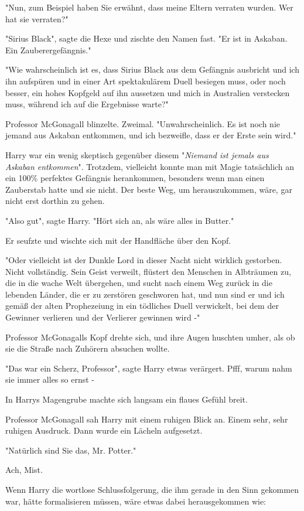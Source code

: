 {"Nun, zum Beispiel haben Sie erwähnt, dass meine Eltern verraten wurden. Wer hat sie verraten?"

"Sirius Black", sagte die Hexe und zischte den Namen fast. "Er ist in Askaban. Ein Zauberergefängnis."

"Wie wahrscheinlich ist es, dass Sirius Black aus dem Gefängnis ausbricht und ich ihn aufspüren und in einer Art spektakulärem Duell besiegen muss, oder noch besser, ein hohes Kopfgeld auf ihn aussetzen und mich in Australien verstecken muss, während ich auf die Ergebnisse warte?"

Professor McGonagall blinzelte. Zweimal. "Unwahrscheinlich. Es ist noch nie jemand aus Askaban entkommen, und ich bezweifle, dass er der Erste sein wird."

Harry war ein wenig skeptisch gegenüber diesem "\emph{Niemand ist jemals aus Askaban entkommen}". Trotzdem, vielleicht konnte man mit Magie tatsächlich an ein 100\% perfektes Gefängnis herankommen, besonders wenn man einen Zauberstab hatte und sie nicht. Der beste Weg, um herauszukommen, wäre, gar nicht erst dorthin zu gehen.

"Also gut", sagte Harry. "Hört sich an, als wäre alles in Butter."

Er seufzte und wischte sich mit der Handfläche über den Kopf.

"Oder vielleicht ist der Dunkle Lord in dieser Nacht nicht wirklich gestorben. Nicht vollständig. Sein Geist verweilt, flüstert den Menschen in Albträumen zu, die in die wache Welt übergehen, und sucht nach einem Weg zurück in die lebenden Länder, die er zu zerstören geschworen hat, und nun sind er und ich gemäß der alten Prophezeiung in ein tödliches Duell verwickelt, bei dem der Gewinner verlieren und der Verlierer gewinnen wird -"

Professor McGonagalls Kopf drehte sich, und ihre Augen huschten umher, als ob sie die Straße nach Zuhörern absuchen wollte.

"Das war ein Scherz, Professor", sagte Harry etwas verärgert. Pfff, warum nahm sie immer alles so ernst -

In Harrys Magengrube machte sich langsam ein flaues Gefühl breit.

Professor McGonagall sah Harry mit einem ruhigen Blick an. Einem sehr, sehr ruhigen Ausdruck. Dann wurde ein Lächeln aufgesetzt.

"Natürlich sind Sie das, Mr. Potter."

Ach, Mist.

Wenn Harry die wortlose Schlussfolgerung, die ihm gerade in den Sinn gekommen war, hätte formalisieren müssen, wäre etwas dabei herausgekommen wie:

}

